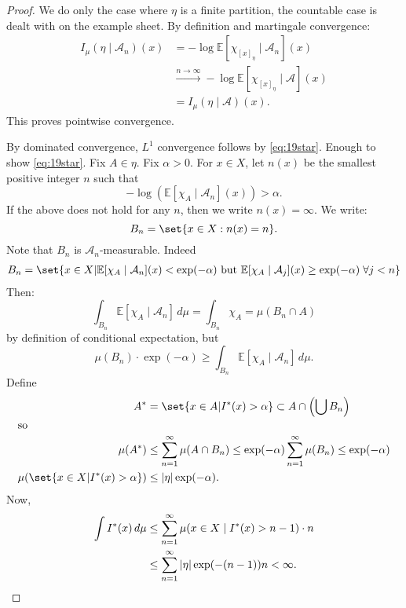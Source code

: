 \documentclass{article}
\begin{document}
\begin{proof}
  We do only the case where $\eta$ is a finite partition, the countable case is dealt with on the example sheet.
  By definition and martingale convergence:
  \begin{align*}
    I_\mu(\eta \mid \mathcal{A}_n)(x) &= - \log \mathbb{E}[\chi_{[x]_\eta} \mid \mathcal{A}_n](x) \\
                                      &\xrightarrow{n \to \infty} -\log \mathbb{E}[\chi_{[x]_\eta} \mid \mathcal{A}](x) \\
                                      &= I_\mu(\eta \mid \mathcal{A})(x).
  \end{align*}
  This proves pointwise convergence.

  By dominated convergence, $L^1$ convergence follows by \eqref{eq:19star}.
  Enough to show \eqref{eq:19star}. Fix $A \in \eta$.
  Fix $\alpha > 0$. For $x \in X$, let $n(x)$ be the smallest positive integer $n$ such that
  \begin{equation*}
    -\log (\mathbb{E}[\chi_A \mid \mathcal{A}_n](x)) > \alpha.
  \end{equation*}
  If the above does not hold for any $n$, then we write $n(x) = \infty$.
  We write:
  \begin{equation*}
    B_n = \set{x \in X : n(x) = n}.
  \end{equation*}
  Note that $B_n$ is $\mathcal{A}_n$-measurable.
  Indeed
  \begin{align*}
    B_n=\set{x\in X|\mathbb{E}[\chi_A\mid\mathcal{A}_n](x)<\exp(-\alpha)\text{ but }\mathbb{E}[\chi_A\mid\mathcal{A}_j](x)\geq\exp(-\alpha)\;\forall j<n}
  \end{align*}
  Then:
  \begin{equation*}
    \int_{B_n}\mathbb{E}[\chi_A\mid\mathcal{A}_n]\,d\mu=\int_{B_n}\chi_A=\mu(B_n\cap A)
  \end{equation*}
  by definition of conditional expectation, but
  \begin{equation*}
    \mu(B_n) \cdot \exp(-\alpha) \geq \int_{B_n} \mathbb{E}[\chi_A \mid \mathcal{A}_n] \, d\mu.
  \end{equation*}
  Define
  \begin{align*}
    A^* &= \set{x \in A | I^*(x) > \alpha} \subset A \cap \left(\bigcup B_n\right) \\
    \shortintertext{so}
    \mu(A^*) &\leq \sum_{n=1}^\infty \mu(A \cap B_n) \leq \exp(-\alpha) \sum_{n=1}^\infty \mu(B_n) \leq \exp(-\alpha) \\
    \mu(\set{x \in X | I^*(x) > \alpha}) &\leq |\eta| \exp(-\alpha).
  \end{align*}
  Now,
  \begin{align*}
    \int I^*(x) \, d\mu &\leq \sum_{n=1}^\infty \mu(x \in X \mid I^*(x) > n-1) \cdot n \\
                        &\leq \sum_{n=1}^\infty |\eta| \exp(-(n-1)) n < \infty. \qedhere
  \end{align*}
\end{proof}
\end{document}

